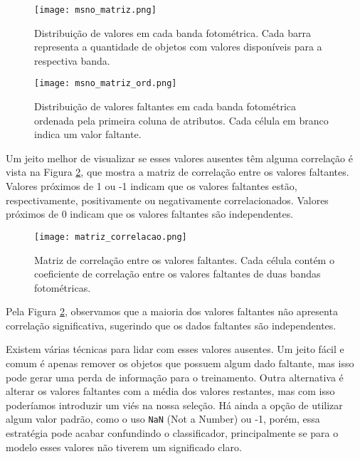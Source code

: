 \begin{figure}[!ht]
    \centering
    \begin{minipage}{0.45\textwidth}
        \centering
        \texttt{[image: msno\_matriz.png]}
        \caption{Distribuição de valores em cada banda fotométrica. Cada barra representa a quantidade de objetos com valores disponíveis para a respectiva banda.}
        \label{msno_matriz}
    \end{minipage}\hfill
    \begin{minipage}{0.45\textwidth}
        \centering
        \texttt{[image: msno\_matriz\_ord.png]}
        \caption{Distribuição de valores faltantes em cada banda fotométrica ordenada pela primeira coluna de atributos. Cada célula em branco indica um valor faltante.}
        \label{msno_matriz_ord}
    \end{minipage}
\end{figure}

\vspace{\baselineskip}

Um jeito melhor de visualizar se esses valores ausentes têm alguma correlação é vista na Figura \ref{matriz_correlacao}, que mostra a matriz de correlação entre os valores faltantes. Valores próximos de 1 ou -1 indicam que os valores faltantes estão, respectivamente, positivamente ou negativamente correlacionados. Valores próximos de 0 indicam que os valores faltantes são independentes.

\begin{figure}[!ht]
    \begin{center}
    \texttt{[image: matriz\_correlacao.png]}
    \caption[]{Matriz de correlação entre os valores faltantes. Cada célula contém o coeficiente de correlação entre os valores faltantes de duas bandas fotométricas.}
    \label{matriz_correlacao}
    \end{center}
\end{figure}

\vspace{\baselineskip}

Pela Figura \ref{matriz_correlacao}, observamos que a maioria dos valores faltantes não apresenta correlação significativa, sugerindo que os dados faltantes são independentes.

\vspace{\baselineskip}

Existem várias técnicas para lidar com esses valores ausentes. Um jeito fácil e comum é apenas remover os objetos que possuem algum dado faltante, mas isso pode gerar uma perda de informação para o treinamento. Outra alternativa é alterar os valores faltantes com a média dos valores restantes, mas com isso poderíamos introduzir um viés na nossa seleção. Há ainda a opção de utilizar algum valor padrão, como o uso \texttt{NaN} (Not a Number) ou -1, porém, essa estratégia pode acabar confundindo o classificador, principalmente se para o modelo esses valores não tiverem um significado claro.

